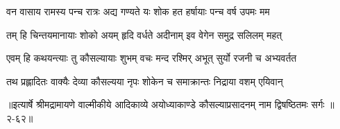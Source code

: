 \twolineshloka
{वन वासाय रामस्य पन्च रात्रः अद्य गण्यते}
{यः शोक हत हर्षायाः पन्च वर्ष उपमः मम} %

\twolineshloka
{तम् हि चिन्तयमानायाः शोको अयम् हृदि वर्धते}
{अदीनाम् इव वेगेन समुद्र सलिलम् महत्} %

\twolineshloka
{एवम् हि कथयन्त्याः तु कौसल्यायाः शुभम् वचः}
{मन्द रश्मिर् अभूत् सुर्यो रजनी च अभ्यवर्तत} %

\twolineshloka
{तथ प्रह्लादितः वाक्यैः देव्या कौसल्यया नृपः}
{शोकेन च समाक्रान्तः निद्राया वशम् एयिवान्} %


॥इत्यार्षे श्रीमद्रामायणे वाल्मीकीये आदिकाव्ये अयोध्याकाण्डे कौसल्याप्रसादनम् नाम द्विषष्ठितमः सर्गः ॥२-६२॥

